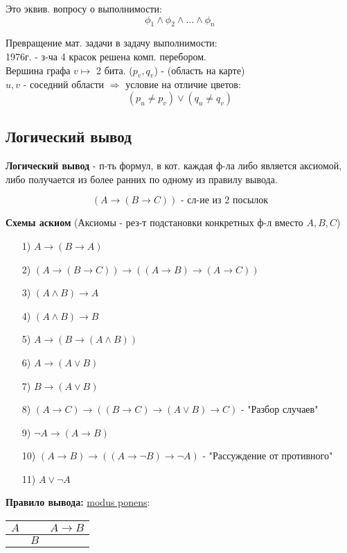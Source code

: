 Это эквив. вопросу о выполнимости:
\[
  \phi_1 \land \phi_2 \land \ldots \land \phi_n
\]
\begin{example}
Превращение мат. задачи в задачу выполнимости: \\
1976г. - з-ча 4 красок решена комп. перебором. \\ 
Вершина графа $v \mapsto $ 2 бита. ($p_v, q_v$) - (область на карте) \\
$u, v$ - соседний области $\Rightarrow$ условие на отличие цветов:
\[
  (p_u \neq p_v) \lor (q_u \neq q_v)
\]
\end{example}
\subsection{Логический вывод}
\begin{definition}
\textbf{Логический вывод} - п-ть формул, в кот. каждая ф-ла либо является аксиомой, либо получается из более ранних по одному из правилу вывода.
\end{definition}

\begin{note}
  \[
    (A \rightarrow (B \rightarrow C)) \text{ - сл-ие из 2 посылок}
  \]
\end{note}
\textbf{Схемы аскиом} (Аксиомы - рез-т подстановки конкретных ф-л вместо $A, B, C$)
\begin{itemize}
  \item [1) ] $A \rightarrow (B \rightarrow A)$
  \item [2) ] $(A \rightarrow (B \rightarrow C)) \rightarrow ((A \rightarrow B) \rightarrow (A \rightarrow C))$
  \item [3) ] $(A \land B) \rightarrow A$
  \item [4) ] $(A \land B) \rightarrow B$
  \item [5) ] $A \rightarrow (B \rightarrow (A \land B))$
  \item [6) ] $A \rightarrow (A \lor B)$
  \item [7) ] $B \rightarrow (A \lor B)$
  \item [8) ] $(A \rightarrow C) \rightarrow ((B \rightarrow C) \rightarrow (A \lor B) \rightarrow C)$ - "Разбор случаев"
  \item [9) ] $\neg A \rightarrow (A \rightarrow B)$
  \item [10) ] $(A \rightarrow B) \rightarrow ((A \rightarrow \neg B) \rightarrow \neg A)$ - "Рассуждение от противного"
  \item [11) ] $A \lor \neg A$
\end{itemize}
  \textbf{Правило вывода:} \underline{modus ponens}:
  \begin{center}
  \begin{tabular}{ c c c } 
    $A$ & & $A \rightarrow B$ \\ 
   \hline
      & $B$ &
  \end{tabular}
  \end{center}


